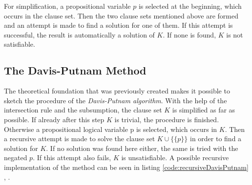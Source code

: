 For simplification, a propositional variable $p$ is selected at the beginning, which occurs in the clause set. Then the two clause sets mentioned above are formed and an attempt is made to find a solution for one of them. If this attempt is successful, the result is automatically a solution of $K$. If none is found, $K$ is not satisfiable.

\subsection{The Davis-Putnam Method}
\label{sub:sciDavisPutnamMethod}
The theoretical foundation that was previously created makes it possible to sketch the procedure of the \textit{Davis-Putnam algorithm}. With the help of the intersection rule and the subsumption, the clause set $K$ is simplified as far as possible. If already after this step $K$ is trivial, the procedure is finished. Otherwise a propositional logical variable p is selected, which occurs in $K$. Then a recursive attempt is made to solve the clause set $K \cup \bigl\{\{p\}\bigr\}$ in order to find a solution for $K$. If no solution was found here either, the same is tried with the negated $p$. If this attempt also fails, $K$ is unsatisfiable. A possible recursive implementation of the method can be seen in listing \ref{code:recursiveDavisPutnam} \cite{Zhang2000}, \cite{Stroetman2019}.

